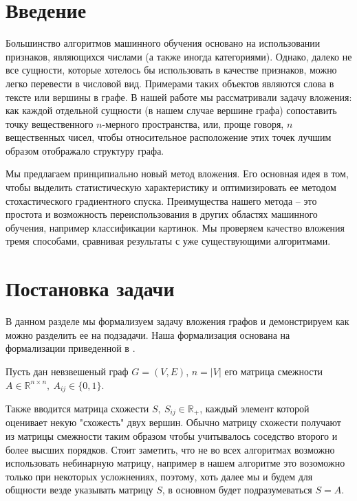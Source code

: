 \documentclass[12pt,a4paper]{extarticle}
\newcommand{\R}{\mathbb{R}}
\begin{document}
    \tableofcontents

    \newpage

    \section{Введение}
    Большинство алгоритмов машинного обучения основано на использовании
    признаков, являющихся числами (а также иногда категориями).
    Однако, далеко не все сущности, которые хотелось бы использовать в качестве признаков,
    можно легко перевести в числовой вид.
    Примерами таких объектов являются слова в тексте или вершины в графе.
    В нашей работе мы рассматривали задачу вложения: как каждой отдельной сущности (в нашем
    случае вершине графа) сопоставить точку вещественного $n$-мерного пространства,
    или, проще говоря, $n$ вещественных чисел, чтобы относительное
    расположение этих точек лучшим образом отображало структуру графа.
    
    Мы предлагаем принципиально новый метод вложения.
    Его основная идея в том, чтобы выделить статистическую характеристику и оптимизировать ее методом стохастического градиентного спуска.
    Преимущества нашего метода -- это простота и возможность переиспользования в других областях машинного обучения, например классификации картинок.
    Мы проверяем качество вложения тремя способами, сравнивая результаты с уже существующими алгоритмами.

    \section{Постановка задачи}
    В данном разделе мы формализуем задачу вложения графов и демонстрируем как можно разделить ее на подзадачи. Наша формализация основана на формализации приведенной в \cite{survey2}.

    Пусть дан невзвешеный граф $G = (V, E)$, $n = |V|$ его матрица смежности $A \in \R^{n \times n},\ A_{ij} \in \{0, 1\}$.
    
    Также вводится матрица схожести $S,\ S_{ij} \in \R_{+}$,  каждый элемент которой оценивает некую "схожесть" двух вершин. Обычно матрицу схожести получают из матрицы смежности таким образом чтобы учитывалось соседство второго и более высших порядков. Стоит заметить, что не во всех алгоритмах возможно использовать небинарную матрицу, например в нашем алгоритме это возоможно только при некоторых усложнениях, поэтому, хоть далее мы и будем для общности везде указывать матрицу $S$, в основном будет подразумеваться $S = A$.
    
\end{document}
